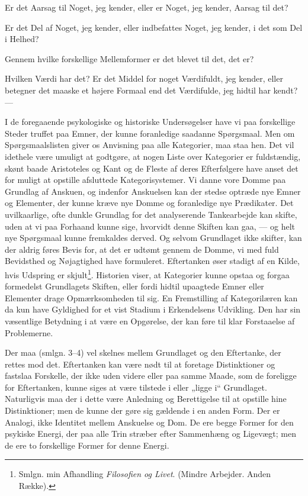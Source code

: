 \documentclass[12pt,a4paper]{book}
\newcommand{\apage}[1]{\marginnote{\footnotesize\textit{[#1]}}}
\begin{document}
Er det Aarsag til Noget, jeg kender, eller er Noget, jeg kender, Aarsag
til det?

Er det Del af Noget, jeg kender, eller indbefattes Noget, jeg kender, i
det som Del i Helhed?

Gennem hvilke forskellige Mellemformer er det blevet til det, det er?

Hvilken Værdi har det? Er det Middel for noget Værdifuldt, jeg kender,
eller betegner det maaske et højere Formaal end det Værdifulde, jeg hidtil har kendt? ---

I de foregaaende psykologiske og historiske Undersøgelser have vi paa
forskellige Steder truffet paa Emner, der kunne foranledige saadanne
Spørgsmaal. Men om Spørgsmaalslisten giver os Anvisning paa alle
Kategorier, maa staa hen. Det vil idethele være umuligt at godtgøre, at
nogen Liste over Kategorier er fuldstændig, skønt baade Aristoteles og
Kant og de Fleste af deres Efterfølgere have anset det for muligt at
opstille afsluttede Kategorisystemer. Vi danne vore Domme paa Grundlag af
Anskuen, og indenfor Anskuelsen kan der stedse optræde nye Emner og
Elementer, der kunne kræve nye Domme og foranledige nye Prædikater. Det
uvilkaarlige, ofte dunkle Grundlag for det analyserende Tankearbejde kan
skifte, uden at vi paa Forhaand kunne sige, hvorvidt denne Skiften kan
gaa, --- og helt nye Spørgsmaal kunne fremkaldes derved. Og selvom
Grundlaget ikke skifter, kan der aldrig føres Bevis for, at det er
udtømt gennem de Domme, vi med fuld Bevidsthed og Nøjagtighed have
formuleret. Eftertanken øser stadigt af en Kilde, hvis Udspring er
skjult\footnote{Smlgn. min Afhandling \emph{Filosofien og Livet}. (Mindre
Arbejder. Anden Række).}. Historien viser, at Kategorier kunne opstaa og
forgaa formedelst Grundlagets Skiften, eller fordi hidtil upaagtede Emner
eller Elementer drage Opmærksomheden til sig. En Fremstilling af
Kategorilæren kan da kun have Gyldighed for et vist Stadium i
Erkendelsens Udvikling. Den har sin væsentlige Betydning i at \apage{139} være en
Opgørelse, der kan føre til klar Forstaaelse af Problemerne.

Der maa (smlgn. 3--4) vel skelnes mellem Grundlaget og den Eftertanke,
der rettes mod det. Eftertanken kan være nødt til at foretage
Distinktioner og fastslaa Forskelle, der ikke uden videre eller paa
samme Maade, som de foreligge for Eftertanken, kunne siges at være
tilstede i eller „ligge i“ Grundlaget. Naturligvis maa der i dette være
Anledning og Berettigelse til at opstille hine Distinktioner; men de
kunne der gøre sig gældende i en anden Form. Der er Analogi, ikke
Identitet mellem Anskuelse og Dom. De ere begge Former for den psykiske
Energi, der paa alle Trin stræber efter Sammenhæng og Ligevægt; men de
ere to forskellige Former for denne Energi.
\end{document}
